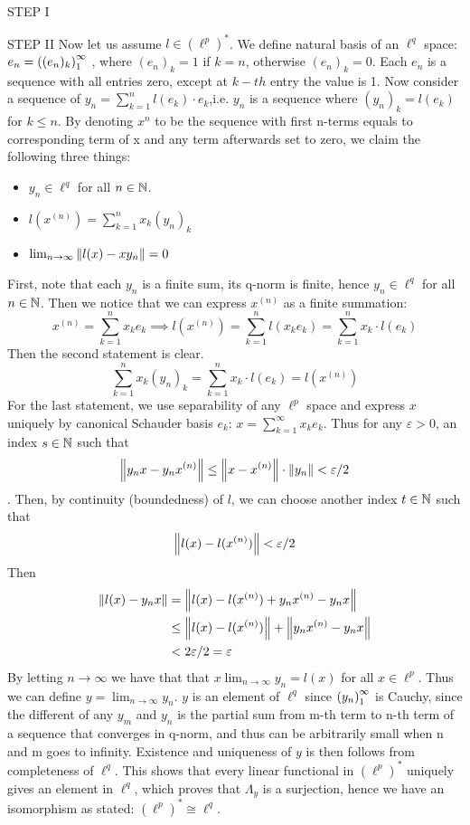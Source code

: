 \begin{theorem}
\begin{pf}{STEP I}{}
\end{pf}
\begin{pf}{STEP II}{}
	Now let us assume $l\in(\ell^p)^*$. We define natural basis of an $\ell^q$ space: $e_n=\left({(e_n)_k}\right)_1^\infty$ , where $(e_n)_k=1$ if $k=n$, otherwise $(e_n)_k=0$. Each $e_n$ is a sequence with all entries zero, except at $k-th$ entry the value is 1. Now consider a sequence of $y_n=\sum_{k=1}^nl(e_k)\cdot e_k$,i.e. $y_n$ is a sequence where $(y_n)_k=l(e_k)$ for $k\leq n$. By denoting $x^n$ to be the sequence with first n-terms equals to corresponding term of x and any term afterwards set to zero, we claim the following three things:
	\begin{itemize}
		\item $y_n\in\ell^q$ for all $n\in\mathbb{N}$. 
		\item $l(x^{(n)})=\sum_{k=1}^nx_k(y_n)_k$
		\item $\lim_{n\to\infty}\left\|{l(x)-xy_n}\right\|=0$
	\end{itemize}
	First, note that each $y_n$ is a finite sum, its q-norm is finite, hence $y_n\in\ell^q$ for all $n\in\mathbb{N}$.  Then we notice that we can express $x^(n)$ as a finite summation:
	$$
	x^{(n)}=\sum_{k=1}^nx_ke_k\implies l(x^{(n)})=\sum_{k=1}^nl(x_ke_k)=\sum_{k=1}^nx_k\cdot l(e_k)
	$$
	Then the second statement is clear.
	$$
	\sum_{k=1}^nx_k(y_n)_k=\sum_{k=1}^nx_k\cdot l(e_k)=l(x^{(n)})
	$$
	For the last statement, we use separability of any $\ell^p$ space and express $x$ uniquely by canonical Schauder basis $e_k$: $x=\sum_{k=1}^\infty x_ke_k$. Thus for any $\varepsilon>0$, an index $s\in\mathbb{N}$ such that 
	$$
	\left\|{y_nx-y_nx^{(n)}}\right\|\leq
	\left\|{x-x^{(n)}}\right\|\cdot\left\|{y_n}\right\|
	<\varepsilon/2
	$$.
	Then, by continuity (boundedness) of $l$, we can choose another index $t\in\mathbb{N}$ such that 
	$$
	\left\|{l(x)-l(x^{(n)})}\right\|<\varepsilon/2
	$$
	Then 
	\begin{equation}
		\begin{split}
			\left\|{l(x)-y_nx}\right\|&=\left\|{l(x)-l(x^{(n)})+y_nx^{(n)}-y_nx}\right\|\\
			&\leq\left\|{l(x)-l(x^{(n)})}\right\|+\left\|{y_nx^{(n)}-y_nx}\right\|\\
			&<2\varepsilon/2=\varepsilon
		\end{split}
	\end{equation}
	By letting $n\to\infty$ we have that that $x\lim_{n\to\infty}y_n=l(x)$ for all $x\in\ell^p$. Thus we can define $y=\lim_{n\to\infty}y_n$. $y$ is an element of $\ell^q$ since $\left({y_n}\right)_1^\infty$ is Cauchy, since the different of any $y_m$ and $y_n$ is the partial sum from m-th term to n-th term of a sequence that converges in q-norm, and thus can be arbitrarily small when n and m goes to infinity. Existence and uniqueness of $y$ is then follows from completeness of $\ell^q$. This shows that every linear functional in $(\ell^p)^*$ uniquely gives an element in $\ell^q$, which proves that $\Lambda_y$ is a surjection, hence we have an isomorphism as stated: $(\ell^p)^*\cong\ell^q$.
\end{pf}
\end{theorem}


